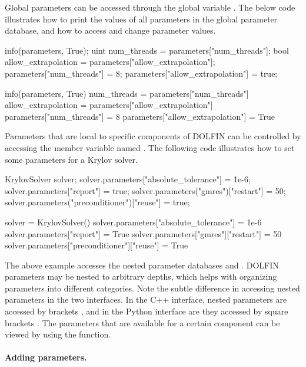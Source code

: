 Global parameters can be accessed through the global variable
. The below code illustrates how to print the values of
all parameters in the global parameter database, and how to access and
change parameter values.
\begin{c++}
info(parameters, True);
uint num_threads = parameters["num_threads"];
bool allow_extrapolation = parameters["allow_extrapolation"];
parameters["num_threads"] = 8;
parameters["allow_extrapolation"] = true;
\end{c++}
\begin{python}
info(parameters, True)
num_threads = parameters["num_threads"]
allow_extrapolation = parameters["allow_extrapolation"]
parameters["num_threads"] = 8
parameters["allow_extrapolation"] = True
\end{python}
Parameters that are local to specific components of DOLFIN can be
controlled by accessing the member variable named . The
following code illustrates how to set some parameters for a Krylov solver.
\begin{c++}
KrylovSolver solver;
solver.parameters["absolute_tolerance"] = 1e-6;
solver.parameters["report"] = true;
solver.parameters("gmres")["restart"] = 50;
solver.parameters("preconditioner")["reuse"] = true;
\end{c++}
\begin{python}
solver = KrylovSolver()
solver.parameters["absolute_tolerance"] = 1e-6
solver.parameters["report"] = True
solver.parameters["gmres"]["restart"] = 50
solver.parameters["preconditioner"]["reuse"] = True
\end{python}
The above example accesses the nested parameter databases 
and . DOLFIN parameters may be nested to
arbitrary depths, which helps with organizing parameters into different
categories. Note the subtle difference in accessing nested parameters in
the two interfaces. In the C++ interface, nested parameters are accessed
by brackets , and in the Python interface are they accessed
by square brackets \emp{["..."]}. The parameters that are available for
a certain component can be viewed by using the  function.

\paragraph{Adding parameters.}

